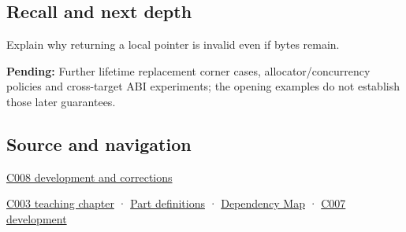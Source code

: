 \subsection{Recall and next depth}\label{appendix-0b104bcba06b-recall-and-next-depth}

Explain why returning a local pointer is invalid even if bytes remain.

\textbf{Pending:} Further lifetime replacement corner cases, allocator/concurrency policies and cross-target ABI experiments; the opening examples do not establish those later guarantees.

\subsection{Source and navigation}\label{appendix-0b104bcba06b-source-and-navigation}

\hyperref[appendix-fd090d982a15-m008---parts-113-126]{C008 development and corrections}

\hyperref[01-foundations-i-ch002-where-the-bytes-live]{C003 teaching chapter} · \hyperref[appendix-fd090d982a15-m003---parts-41-60]{Part definitions} · \hyperref[appendix-4ad47bdd269a]{Dependency Map} · \hyperref[01-foundations-i-ch002-storage-is-a-place-an-object-is-its-occupant]{C007 development}
